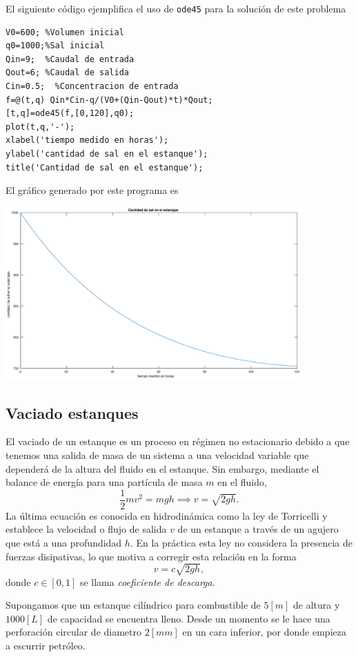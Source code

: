 \documentclass[letter,11pt]{article}
\begin{document}
El siguiente c\'odigo ejemplifica el uso de \texttt{ode45} para la soluci\'on de este problema
\begin{lstlisting}
V0=600; %Volumen inicial
q0=1000;%Sal inicial
Qin=9;  %Caudal de entrada
Qout=6; %Caudal de salida
Cin=0.5;  %Concentracion de entrada
f=@(t,q) Qin*Cin-q/(V0+(Qin-Qout)*t)*Qout;
[t,q]=ode45(f,[0,120],q0);
plot(t,q,'-');
xlabel('tiempo medido en horas');
ylabel('cantidad de sal en el estanque');
title('Cantidad de sal en el estanque');
\end{lstlisting}
El gr\'afico generado por este programa es
\begin{center}
\includegraphics[width=0.85\textwidth]{eje2.eps}
\end{center}

\subsection{Vaciado estanques}
El vaciado de un estanque es un proceso en r\'egimen no estacionario debido a que tenemos una salida de masa de un sistema a una velocidad variable que depender\'a de la altura del fluido en el estanque. Sin embargo, mediante el balance de energ\'ia para una part\'icula de masa $m$ en el fluido,
$$
\frac{1}{2}mv^2=mgh \implies v=\sqrt{2gh}.
$$
La \'ultima ecuaci\'on es conocida en hidrodin\'amica como la ley de Torricelli y establece la velocidad o flujo de salida $v$ de un estanque a trav\'es de un agujero que est\'a a una profundidad $h$. En la pr\'actica esta ley no considera la presencia de fuerzas disipativas, lo que motiva a corregir esta relaci\'on en la forma
$$
v=c\sqrt{2gh},
$$
donde $c \in [0,1]$ se llama \emph{coeficiente de descarga}.

Supongamos que un estanque cil\'indrico para combustible de $5[m]$ de altura y $1000[L]$ de capacidad se encuentra lleno. Desde un momento se le hace una perforaci\'on circular de diametro $2[mm]$ en un cara inferior, por donde empieza a escurrir petr\'oleo. 
\end{document}
